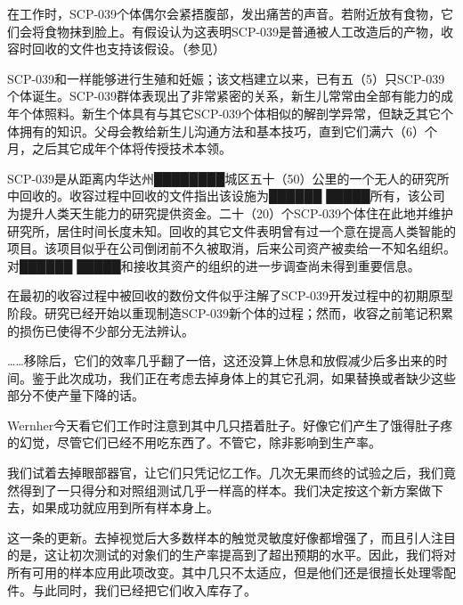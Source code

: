 在工作时，SCP-039个体偶尔会紧捂腹部，发出痛苦的声音。若附近放有食物，它们会将食物抹到脸上。有假设认为这表明SCP-039是普通被人工改造后的产物，收容时回收的文件也支持该假设。（参见）

SCP-039和一样能够进行生殖和妊娠；该文档建立以来，已有五（5）只SCP-039个体诞生。SCP-039群体表现出了非常紧密的关系，新生儿常常由全部有能力的成年个体照料。新生个体具有与其它SCP-039个体相似的解剖学异常，但缺乏其它个体拥有的知识。父母会教给新生儿沟通方法和基本技巧，直到它们满六（6）个月，之后其它成年个体将传授技术本领。

SCP-039是从距离内华达州████████城区五十（50）公里的一个无人的研究所中回收的。收容过程中回收的文件指出该设施为██████ █████所有，该公司为提升人类天生能力的研究提供资金。二十（20）个SCP-039个体住在此地并维护研究所，居住时间长度未知。回收的其它文件表明曾有过一个意在提高人类智能的项目。该项目似乎在公司倒闭前不久被取消，后来公司资产被卖给一不知名组织。对██████ █████和接收其资产的组织的进一步调查尚未得到重要信息。

 在最初的收容过程中被回收的数份文件似乎注解了SCP-039开发过程中的初期原型阶段。研究已经开始以重现制造SCP-039新个体的过程；然而，收容之前笔记积累的损伤已使得不少部分无法辨认。

\begin{center}



\end{center}

\begin{scpbox}

……移除后，它们的效率几乎翻了一倍，这还没算上休息和放假减少后多出来的时间。鉴于此次成功，我们正在考虑去掉身体上的其它孔洞，如果替换或者缺少这些部分不使产量下降的话。

Wernher今天看它们工作时注意到其中几只捂着肚子。好像它们产生了饿得肚子疼的幻觉，尽管它们已经不用吃东西了。不管它，除非影响到生产率。

\end{scpbox}

\begin{scpbox}

我们试着去掉眼部器官，让它们只凭记忆工作。几次无果而终的试验之后，我们竟然得到了一只得分和对照组测试几乎一样高的样本。我们决定按这个新方案做下去，如果成功就应用到所有样本身上。

这一条的更新。去掉视觉后大多数样本的触觉灵敏度好像都增强了，而且引人注目的是，这让初次测试的对象们的生产率提高到了超出预期的水平。因此，我们将对所有可用的样本应用此项改变。其中几只不太适应，但是他们还是很擅长处理零配件。与此同时，我们已经把它们收入库存了。

\end{scpbox}

